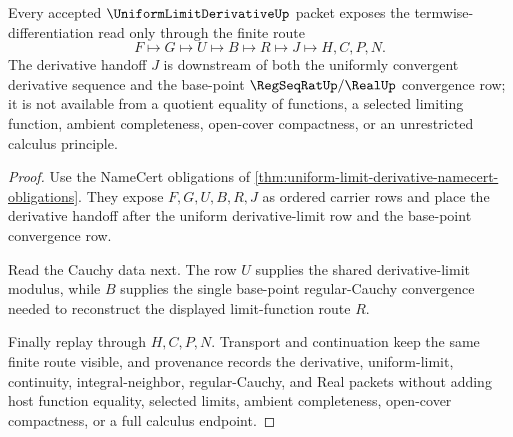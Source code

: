 \begin{theorem}
\label{thm:uniform-limit-derivative-cauchy-route}
Every accepted $\UniformLimitDerivativeUp$ packet exposes the termwise-differentiation read only through the finite route
$$
F \longmapsto G \longmapsto U \longmapsto B \longmapsto R \longmapsto J \longmapsto H,C,P,N .
$$
The derivative handoff $J$ is downstream of both the uniformly convergent derivative sequence and the base-point $\RegSeqRatUp/\RealUp$ convergence row; it is not available from a quotient equality of functions, a selected limiting function, ambient completeness, open-cover compactness, or an unrestricted calculus principle.
\end{theorem}
\begin{proof}
Use the NameCert obligations of \autoref{thm:uniform-limit-derivative-namecert-obligations}. They expose $F,G,U,B,R,J$ as ordered carrier rows and place the derivative handoff after the uniform derivative-limit row and the base-point convergence row.

Read the Cauchy data next. The row $U$ supplies the shared derivative-limit modulus, while $B$ supplies the single base-point regular-Cauchy convergence needed to reconstruct the displayed limit-function route $R$.

Finally replay through $H,C,P,N$. Transport and continuation keep the same finite route visible, and provenance records the derivative, uniform-limit, continuity, integral-neighbor, regular-Cauchy, and Real packets without adding host function equality, selected limits, ambient completeness, open-cover compactness, or a full calculus endpoint.
\end{proof}


